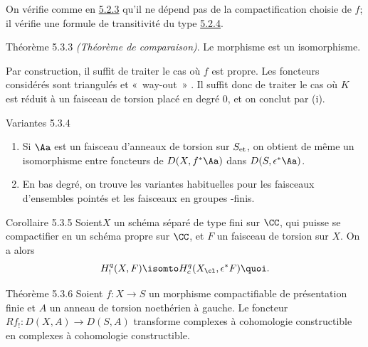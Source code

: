 \documentclass[10pt]{../fichiers-configuration-latex/smfart}
\begin{document}
On vérifie comme en \hyperref[XVII.lem5.2.3]{5.2.3} qu'il ne dépend pas de la compactification
choisie de $f$; il vérifie une formule de transitivité du type \hyperref[XVII.lem5.2.4]{5.2.4}.

\begin{enonce*}{Théorème 5.3.3}
\emph{(Théorème de comparaison)}. Le morphisme  est un isomorphisme.
\end{enonce*}

Par construction, il suffit de traiter le cas où $f$ est propre. Les
foncteurs considérés sont triangulés et « way-out » \cite[I 7]{SGA4-17:RD}. Il
suffit donc de traiter le cas où $K$ est réduit à un faisceau de
torsion placé en degré $0$, et on conclut par  (i).

\begin{enonce*}[remark]{Variantes 5.3.4}
\begin{enumerate}
\renewcommand{\theenumi}{\roman{enumi}}
\renewcommand{\labelenumi}{(\theenumi)}
\item Si $\Aa$ est un faisceau d'anneaux de torsion sur
$S_{\text{\rm et}}$, on obtient de même un isomorphisme 
entre foncteurs de $D(X,f^{\ast}\Aa)$ dans $D(S,\epsilon^{\ast}\Aa)$.

\item En bas degré, on trouve les variantes habituelles pour les
faisceaux d'ensembles pointés et les faisceaux en groupes \iInd-finis.
\end{enumerate}
\end{enonce*}

\begin{enonce*}{Corollaire 5.3.5}
Soient\pageoriginale $X$ un schéma séparé de type fini sur
$\CC$, qui puisse se compactifier en un schéma propre sur
$\CC$, et $F$ un faisceau de torsion sur $X$. On a alors
$$
H^{q}_{!}(X,F)\isomto
H^{q}_c(X_{\cl},\epsilon^{\ast}F){\quoi}.
$$
\end{enonce*}

\begin{enonce*}{Théorème 5.3.6}
Soient $f:X\rightarrow S$ un morphisme compactifiable de présentation
finie et $A$ un anneau de torsion noethérien à gauche. Le foncteur
$Rf_{!}:D(X,A)\rightarrow D(S,A)$ transforme complexes à cohomologie
constructible en complexes à cohomologie constructible.
\end{enonce*}
\end{document}
